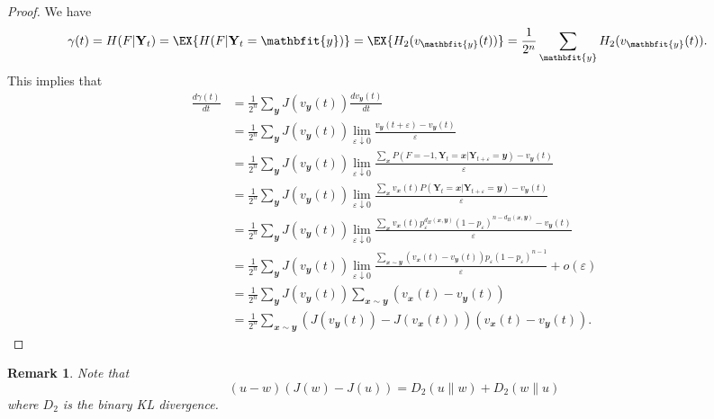 \documentclass[conference,letterpaper,onecolumn]{IEEEtran}
\theoremstyle{plain}%
\newtheorem{rem}{Remark}
\newcommand{\bY}{\mathbf{Y}}
\newcommand{\by}{\mathbfit{y}}
\newcommand{\bx}{\mathbfit{x}}
\begin{document}
\begin{proof}
We have
    { \begin{align*}
        \gamma(t) &= H(F|\bY_t)= \EX{H(F|\bY_t = \by)}= \EX{H_2(v_\by(t))}= \frac{1}{2^n}\sum_\by H_2(v_\by(t)).
    \end{align*}}
    This implies that
    {\begin{align*}
        \frac{d\gamma(t)}{dt} &= \frac{1}{2^n}\sum_\by J(v_\by(t))\frac{dv_\by(t)}{dt}\\
        &= \frac{1}{2^n}\sum_\by J(v_\by(t)) \lim_{\varepsilon \downarrow 0} \frac{v_{\by}(t+\varepsilon)-v_{\by}(t)}{\varepsilon}\\
        &= \frac{1}{2^n}\sum_\by J(v_\by(t))\lim_{\varepsilon \downarrow 0} \frac{\sum_\bx P(F = -1,\bY_t = \bx|\bY_{t + \varepsilon} = \by) - v_\by(t)}{\varepsilon}\\
        &= \frac{1}{2^n}\sum_\by J(v_\by(t))\lim_{\varepsilon \downarrow 0} \frac{\sum_\bx v_\bx(t)P(\bY_t = \bx|\bY_{t + \varepsilon} = \by) -v_\by(t)}{\varepsilon}\\
        &= \frac{1}{2^n}\sum_\by J(v_\by(t))\lim_{\varepsilon \downarrow 0}\frac{\sum_\bx v_\bx(t)p_\varepsilon^{d_H(\bx,\by)}\left(1-p_\varepsilon\right)^{n - d_H(\bx,\by)} - v_\by(t)}{\varepsilon}\\
        &= \frac{1}{2^n}\sum_\by J(v_\by(t))\lim_{\varepsilon \downarrow 0}\frac{ \sum\limits_{\bx\sim \by}(v_\bx(t)-v_\by(t))p_\varepsilon\left(1-p_\varepsilon\right)^{n - 1}}{\varepsilon} + o(\varepsilon)\\
        &= \frac{1}{2^n}\sum_\by J(v_\by(t))\sum_{\bx\sim \by}(v_\bx(t) - v_\by(t))\\
        &= \frac{1}{2^n}\sum_{\bx\sim \by}(J(v_\by(t)) - J(v_\bx(t)))(v_\bx(t) - v_\by(t)).
    \end{align*}}
\end{proof}
\begin{rem} Note that
    $$(u-w)(J(w)-J(u))=D_2(u\|w)+D_2(w\|u)$$ where $D_2$ is the binary KL divergence.
\end{rem}
\end{document}

